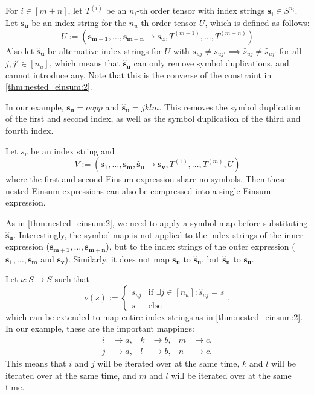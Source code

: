 \begin{theorem}
    \label{thm:nested_einsum:3}

    For $i \in [m + n]$, let $T^{(i)}$ be an $n_i$-th order tensor with index strings $\bm{s_i} \in S^{n_i}$.
    Let $\bm{s_u}$ be an index string for the $n_u$-th order tensor $U$, which is defined as follows:
    $$U := (\bm{s_{m + 1}},\dots,\bm{s_{m + n}} \rightarrow \bm{s_u}, T^{(m + 1)},\dots,T^{(m + n)})$$
    Also let $\bm{\hat{s}_u}$ be alternative index strings for $U$ with $s_{uj} \neq s_{uj'} \implies \hat{s}_{uj} \neq \hat{s}_{uj'}$ for all $j, j' \in [n_u]$,
    which means that $\bm{\hat{s}_u}$ can only remove symbol duplications, and cannot introduce any.
    Note that this is the converse of the constraint in \autoref{thm:nested_einsum:2}.

    In our example, $\bm{s_u} = oopp$ and $\bm{\hat{s}_u} = jklm$.
    This removes the symbol duplication of the first and second index, as well as the symbol duplication of the third and fourth index.

    Let $s_v$ be an index string and
    $$V := (\bm{s_1},\dots,\bm{s_m}, \bm{\hat{s}_u} \rightarrow \bm{s_v}, T^{(1)},\dots,T^{(m)}, U)$$
    where the first and second Einsum expression share no symbols.
    Then these nested Einsum expressions can also be compressed into a single Einsum expression.

    As in \autoref{thm:nested_einsum:2}, we need to apply a symbol map before substituting $\bm{\hat{s}_u}$.
    Interestingly, the symbol map is not applied to the index strings of the inner expression ($\bm{s_{m + 1}},\dots,\bm{s_{m + n}}$),
    but to the index strings of the outer expression ($\bm{s_1},\dots,\bm{s_m}$ and $\bm{s_v}$).
    Similarly, it does not map $\bm{s_u}$ to $\bm{\hat{s}_u}$, but $\bm{\hat{s}_u}$ to $\bm{s_u}$.

    Let $\nu: S \rightarrow S$ such that
    $$\nu(s) := \begin{cases}
            s_{uj} & \text{if }\exists j \in [n_u]: \hat{s}_{uj} = s \\
            s      & \text{else}
        \end{cases},$$
    which can be extended to map entire index strings as in \autoref{thm:nested_einsum:2}.
    In our example, these are the important mappings:
    \begin{align*}
        i & \rightarrow a, & k & \rightarrow b, & m & \rightarrow c, \\
        j & \rightarrow a, & l & \rightarrow b, & n & \rightarrow c.
    \end{align*}
    This means that $i$ and $j$ will be iterated over at the same time, $k$ and $l$ will be iterated over at the same time, and $m$ and $l$ will be iterated over at the same time.


\end{theorem}
